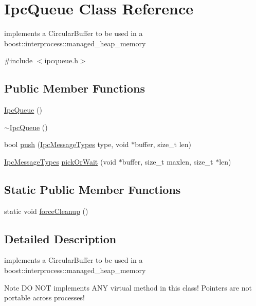 \hypertarget{class_ipc_queue}{}\section{Ipc\+Queue Class Reference}
\label{class_ipc_queue}


implements a Circular\+Buffer to be used in a boost\+::interprocess\+::managed\+\_\+heap\+\_\+memory  




{\ttfamily \#include $<$ipcqueue.\+h$>$}

\subsection*{Public Member Functions}
\begin{DoxyCompactItemize}
\item 
\mbox{\hyperlink{class_ipc_queue_a82b44b71d9d7e37a2157c68797088985}{Ipc\+Queue}} ()
\item 
\mbox{\hyperlink{class_ipc_queue_a1cc74cc9e8a1d7b10239dc3f575b6ab7}{$\sim$\+Ipc\+Queue}} ()
\item 
bool \mbox{\hyperlink{class_ipc_queue_ac701db4e58a21577025bfd6890196d0f}{push}} (\mbox{\hyperlink{ipcmsgtypes_8h_a59f75a61492e64aebfae0cc49cc26683}{Ipc\+Message\+Types}} type, void $\ast$buffer, size\+\_\+t len)
\item 
\mbox{\hyperlink{ipcmsgtypes_8h_a59f75a61492e64aebfae0cc49cc26683}{Ipc\+Message\+Types}} \mbox{\hyperlink{class_ipc_queue_a04638432367d346bda2ca47ead138d4a}{pick\+Or\+Wait}} (void $\ast$buffer, size\+\_\+t maxlen, size\+\_\+t $\ast$len)
\end{DoxyCompactItemize}
\subsection*{Static Public Member Functions}
\begin{DoxyCompactItemize}
\item 
static void \mbox{\hyperlink{class_ipc_queue_aff0d169603716788451ee05df960f289}{force\+Cleanup}} ()
\end{DoxyCompactItemize}


\subsection{Detailed Description}
implements a Circular\+Buffer to be used in a boost\+::interprocess\+::managed\+\_\+heap\+\_\+memory 

\begin{DoxyNote}{Note}
DO N\+OT implements A\+NY virtual method in this class! Pointers are not portable across processes! 
\end{DoxyNote}


